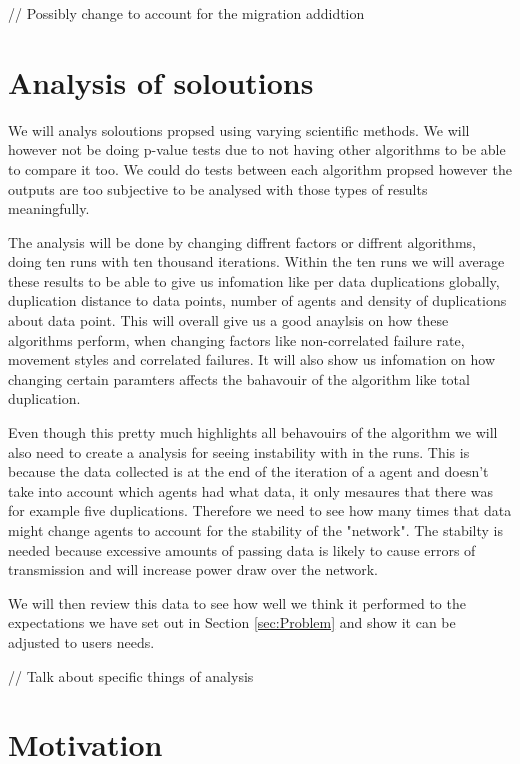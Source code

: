 \documentclass{UoYCSproject}
\begin{document}
// Possibly change to account for the migration addidtion


\section{Analysis of soloutions}
\label{sec:Analysis of soloutions}

We will analys soloutions propsed using varying scientific methods.
We will however not be doing p-value tests due to not having other algorithms to be able to compare it too.
We could do tests between each algorithm propsed however the outputs are too subjective to be analysed with those types of results meaningfully.

The analysis will be done by changing diffrent factors or diffrent algorithms, doing ten runs with ten thousand iterations.
Within the ten runs we will average these results to be able to give us infomation like per data duplications globally, duplication distance to data points, number of agents and density of duplications about data point.
This will overall give us a good anaylsis on how these algorithms perform, when changing factors like non-correlated failure rate, movement styles and correlated failures.
It will also show us infomation on how changing certain paramters affects the bahavouir of the algorithm like total duplication.

Even though this pretty much highlights all behavouirs of the algorithm we will also need to create a analysis for seeing instability with in the runs.
This is because the data collected is at the end of the iteration of a agent and doesn't take into account which agents had what data, it only mesaures that there was for example five duplications.
Therefore we need to see how many times that data might change agents to account for the stability of the "network".
The stabilty is needed because excessive amounts of passing data is likely to cause errors of transmission and will increase power draw over the network.

We will then review this data to see how well we think it performed to the expectations we have set out in Section \ref{sec:Problem} and show it can be adjusted to users needs.

// Talk about specific things of analysis



\section{Motivation}
\label{sec:Motivation}
\end{document}
